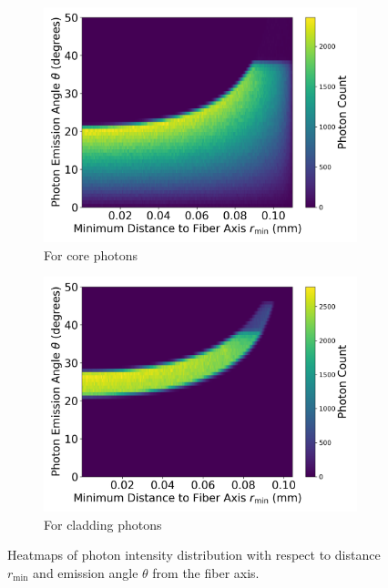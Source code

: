     \begin{figure}[H]
        \centering
        \begin{subfigure}[b]{0.48\textwidth}
            \centering
            \includegraphics[width=\textwidth, scale=0.35]{Figure/rmin_vs_theta_histogram.png}
        \caption{For core photons}
        \end{subfigure}
        \hfill
        \begin{subfigure}[b]{0.48\textwidth}
            \centering
            \includegraphics[width=\textwidth, scale=0.35]{Figure/rmin_vs_theta_histogram_cladding.png}
            \caption{For cladding photons}
        \end{subfigure}
        \caption{Heatmaps of photon intensity distribution with respect to distance \( r_{\text{min}} \) and emission angle \( \theta \) from the fiber axis.}
        \label{dist_1}
    \end{figure}

